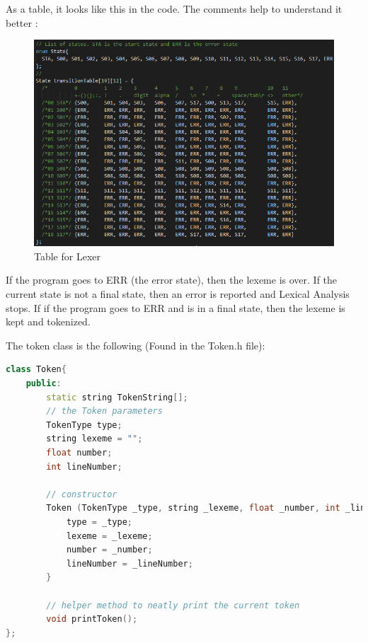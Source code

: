 As a table, it looks like this in the code. The comments help to understand it better \cite{StateTransitionTable}:
\begin{figure}[H]
	\centering
	\includegraphics[width=\textwidth]{Images/Q1_StateTransitionTable.PNG}
	\caption{Table for Lexer}
\end{figure}

If the program goes to ERR (the error state), then the lexeme is over. If the current state is not a final state, then an error is reported and Lexical Analysis stops. If if the program goes to ERR and is in a final state, then the lexeme is kept and tokenized.

The token class is the following (Found in the Token.h file):
\begin{lstlisting}[language=C++]
class Token{
	public:
		static string TokenString[];
		// the Token parameters
		TokenType type;
		string lexeme = "";
		float number;
		int lineNumber;
		
		// constructor
		Token (TokenType _type, string _lexeme, float _number, int _lineNumber){
			type = _type;
			lexeme = _lexeme;
			number = _number;
			lineNumber = _lineNumber;
		}
		
		// helper method to neatly print the current token
		void printToken();
};
\end{lstlisting}

